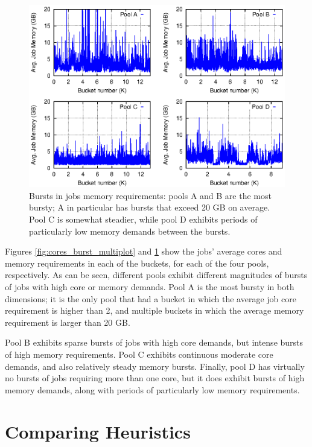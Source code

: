 \begin{figure}\centering
	\includegraphics{figures/memory_burst.eps}
\caption{Bursts in jobs memory requirements: pools A and B are the
  most bursty; A in particular has bursts that exceed 20 GB on average.
  Pool C is somewhat steadier, while pool D exhibits periods of
  particularly low memory demands between the bursts.}
\label{fig:memory_burst_multiplot}
\end{figure}

Figures \ref{fig:cores_burst_multiplot} and
\ref{fig:memory_burst_multiplot} show the jobs' average cores and
memory requirements in each of the buckets, for each of the four pools,
respectively.
As can be seen, different pools exhibit different magnitudes of bursts
of jobs with high core or memory demands.
Pool A is the most bursty in both dimensions; it is the only pool that
had a bucket in which the average job core requirement is higher than
2, and multiple buckets in which the average memory requirement is
larger than 20 GB.

Pool B exhibits sparse bursts of jobs with high core demands, but
intense bursts of high memory requirements.
Pool C exhibits continuous moderate core demands, and also relatively
steady memory bursts.
Finally, pool D has virtually no bursts of jobs requiring more than
one core, but it does exhibit bursts of high memory demands, along
with periods of particularly low memory requirements.


\section{Comparing Heuristics}\label{sec:buckets}

